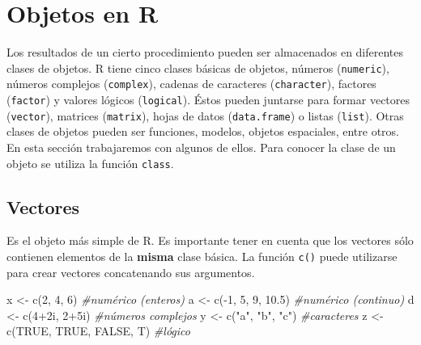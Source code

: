 \documentclass[
]{book}
\newenvironment{Shaded}{\begin{snugshade}}{\end{snugshade}}
\newcommand{\CommentTok}[1]{\textcolor[rgb]{0.56,0.35,0.01}{\textit{#1}}}
\newcommand{\ConstantTok}[1]{\textcolor[rgb]{0.00,0.00,0.00}{#1}}
\newcommand{\DecValTok}[1]{\textcolor[rgb]{0.00,0.00,0.81}{#1}}
\newcommand{\FloatTok}[1]{\textcolor[rgb]{0.00,0.00,0.81}{#1}}
\newcommand{\FunctionTok}[1]{\textcolor[rgb]{0.00,0.00,0.00}{#1}}
\newcommand{\NormalTok}[1]{#1}
\newcommand{\OtherTok}[1]{\textcolor[rgb]{0.56,0.35,0.01}{#1}}
\newcommand{\SpecialCharTok}[1]{\textcolor[rgb]{0.00,0.00,0.00}{#1}}
\newcommand{\StringTok}[1]{\textcolor[rgb]{0.31,0.60,0.02}{#1}}
\begin{document}
\hypertarget{objetos-en-r}{%
\chapter{Objetos en R}\label{objetos-en-r}}

Los resultados de un cierto procedimiento pueden ser almacenados en diferentes
clases de objetos. R tiene cinco clases básicas de objetos, números (\texttt{numeric}),
números complejos (\texttt{complex}), cadenas de caracteres (\texttt{character}),
factores (\texttt{factor}) y valores lógicos (\texttt{logical}). Éstos pueden juntarse para
formar vectores (\texttt{vector}), matrices (\texttt{matrix}), hojas de datos (\texttt{data.frame}) o
listas (\texttt{list}). Otras clases de objetos pueden ser funciones, modelos, objetos
espaciales, entre otros. En esta sección trabajaremos con algunos de ellos.
Para conocer la clase de un objeto se utiliza la función \texttt{class}.

\hypertarget{vectores}{%
\section{Vectores}\label{vectores}}

Es el objeto más simple de R. Es importante tener en cuenta que los vectores
sólo contienen elementos de la \textbf{misma} clase básica. La función \texttt{c()} puede
utilizarse para crear vectores concatenando sus argumentos.

\begin{Shaded}
\begin{Highlighting}[]
\NormalTok{x }\OtherTok{\textless{}{-}} \FunctionTok{c}\NormalTok{(}\DecValTok{2}\NormalTok{, }\DecValTok{4}\NormalTok{, }\DecValTok{6}\NormalTok{)               }\CommentTok{\#numérico (enteros) }
\NormalTok{a }\OtherTok{\textless{}{-}} \FunctionTok{c}\NormalTok{(}\SpecialCharTok{{-}}\DecValTok{1}\NormalTok{, }\DecValTok{5}\NormalTok{, }\DecValTok{9}\NormalTok{, }\FloatTok{10.5}\NormalTok{)        }\CommentTok{\#numérico (continuo)}
\NormalTok{d }\OtherTok{\textless{}{-}} \FunctionTok{c}\NormalTok{(}\DecValTok{4}\SpecialCharTok{+}\NormalTok{2i, }\DecValTok{2}\SpecialCharTok{+}\NormalTok{5i)            }\CommentTok{\#números complejos}
\NormalTok{y }\OtherTok{\textless{}{-}} \FunctionTok{c}\NormalTok{(}\StringTok{"a"}\NormalTok{, }\StringTok{"b"}\NormalTok{, }\StringTok{"c"}\NormalTok{)         }\CommentTok{\#caracteres}
\NormalTok{z }\OtherTok{\textless{}{-}} \FunctionTok{c}\NormalTok{(}\ConstantTok{TRUE}\NormalTok{, }\ConstantTok{TRUE}\NormalTok{, }\ConstantTok{FALSE}\NormalTok{, T)  }\CommentTok{\#lógico}
\end{Highlighting}
\end{Shaded}
\end{document}
